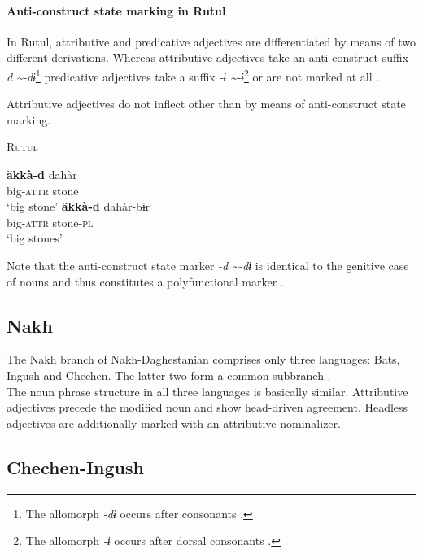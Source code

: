 \paragraph{Anti-construct state marking in Rutul}
In Rutul, attributive and predicative adjectives are differentiated by means of two different derivations. Whereas attributive adjectives take an anti-construct suffix \textit{-d \textasciitilde-dɨ}\footnote{The allomorph \textit{-dɨ} occurs after consonants \citep[224]{alekseev1994a}.} predicative adjectives take a suffix \textit{-ɨ \textasciitilde-ɨ}\footnote{The allomorph \textit{-ɨ} occurs after dorsal consonants \citep[224]{alekseev1994a}.} or are not marked at all \citep[224]{alekseev1994a}.

Attributive adjectives do not inflect other than by means of anti-construct state marking.
\begin{exe}
\ex \textsc{Rutul} \citep[237]{alekseev1994a}
\begin{xlist}
\ex
\gll	\textbf{äkkà-d} dahàr\\
	big-\textsc{attr} stone\\
\glt	‘big stone’
\ex
\gll	\textbf{äkkà-d} dahàr-bɨr\\
	big-\textsc{attr} stone-\textsc{pl}\\
\glt	‘big stones’
\end{xlist}
\end{exe}
Note that the anti-construct state marker \textit{-d \textasciitilde-dɨ} is identical to the genitive case of nouns and thus constitutes a polyfunctional marker \cite{alekseev1994a}.

\subsection{Nakh}
The Nakh branch of Nakh-Daghestanian comprises only three languages: Bats, Ingush and Chechen. The latter two form a common subbranch \citep[220, 233]{salminen2007}.\\

\noindent The noun phrase structure in all three languages is basically similar. Attributive adjectives precede the modified noun and show head-driven agreement. Headless adjectives are additionally marked with an attributive nominalizer.

\subsection{Chechen-Ingush}\label{ingush synchr}
